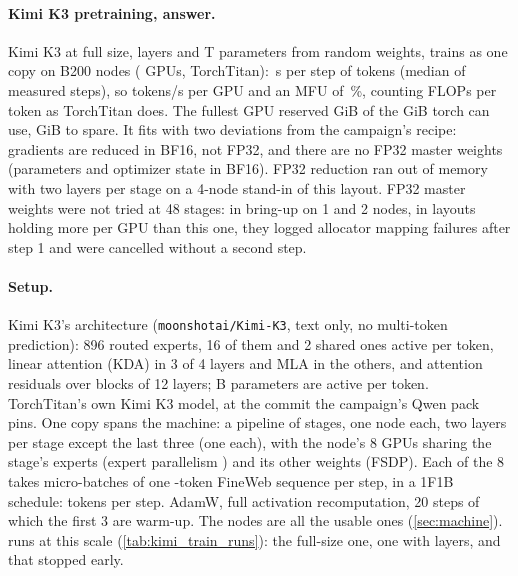 \paragraph{Kimi K3 pretraining, answer.} Kimi K3 at full size, \TriKtLayers{} layers and \TriKtParams T parameters from random weights, trains as one copy on \TriKtNodes{} B200 nodes (\TriKtGpus{} GPUs, TorchTitan): \TriKtStep\,s per step of \TriKtTokens{} tokens (median of \TriKtMeasured{} measured steps), so \TriKtTok{} tokens/s per GPU and an MFU of \TriKtMfu\,\%, counting \TriKtFlops{} FLOPs per token as TorchTitan does. The fullest GPU reserved \TriKtMemWorst{} GiB of the \TriKtMemLimit{} GiB torch can use, \TriKtHeadroom{} GiB to spare. It fits with two deviations from the campaign's recipe: gradients are reduced in BF16, not FP32, and there are no FP32 master weights (parameters and optimizer state in BF16). FP32 reduction ran out of memory with two layers per stage on a 4-node stand-in of this layout. FP32 master weights were not tried at 48 stages: in bring-up on 1 and 2 nodes, in layouts holding more per GPU than this one, they logged allocator mapping failures after step 1 and were cancelled without a second step.

\paragraph{Setup.} Kimi K3's architecture (\texttt{moonshotai/Kimi-K3}, text only, no multi-token prediction): 896 routed experts, 16 of them and 2 shared ones active per token, linear attention (KDA) in 3 of 4 layers and MLA in the others, and attention residuals over blocks of 12 layers; \TriKtActive B parameters are active per token. TorchTitan's own Kimi K3 model, at the commit the campaign's Qwen pack pins. One copy spans the machine: a pipeline of \TriKtPp{} stages, one node each, two layers per stage except the last three (one each), with the node's 8 GPUs sharing the stage's experts (expert parallelism \TriKtEp) and its other weights (FSDP). Each of the 8 takes \TriKtMicro{} micro-batches of one \TriKtSeq-token FineWeb sequence per step, in a 1F1B schedule: \TriKtTokens{} tokens per step. AdamW, full activation recomputation, 20 steps of which the first 3 are warm-up. The \TriKtNodes{} nodes are all the usable ones (\cref{sec:machine}). \TriKtRuns{} runs at this scale (\cref{tab:kimi_train_runs}): the full-size one, one with \TriKtSmallLayers{} layers, and \TriKtFailed{} that stopped early.

